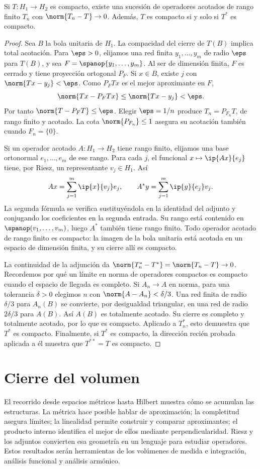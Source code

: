 \begin{teorema}\label{ch32:compactos}
Si $T:H_1\to H_2$ es compacto, existe una sucesión de operadores acotados de rango finito $T_n$ con $\norm{T_n-T}\to0$. Además, $T$ es compacto si y solo si $T^*$ es compacto.
\end{teorema}
\begin{proof}
Sea $B$ la bola unitaria de $H_1$. La compacidad del cierre de $T(B)$ implica total acotación. Para $\eps>0$, elijamos una red finita $y_1,\dots,y_m$ de radio $\eps$ para $T(B)$, y sea $F=\spanop\{y_1,\dots,y_m\}$. Al ser de dimensión finita, $F$ es cerrado y tiene proyección ortogonal $P_F$. Si $x\in B$, existe $j$ con $\norm{Tx-y_j}<\eps$. Como $P_FTx$ es el mejor aproximante en $F$,
\[
 \norm{Tx-P_FTx}\leq\norm{Tx-y_j}<\eps.
\]
Por tanto $\norm{T-P_FT}\leq\eps$. Elegir $\eps=1/n$ produce $T_n=P_{F_n}T$, de rango finito y acotado. La cota $\norm{P_{F_n}}\leq1$ asegura su acotación también cuando $F_n=\{0\}$.

Si un operador acotado $A:H_1\to H_2$ tiene rango finito, elijamos una base ortonormal $e_1,\dots,e_m$ de ese rango. Para cada $j$, el funcional $x\mapsto\ip{Ax}{e_j}$ tiene, por Riesz, un representante $v_j\in H_1$. Así
\[
 Ax=\sum_{j=1}^{m}\ip{x}{v_j}e_j,
 \qquad A^*y=\sum_{j=1}^{m}\ip{y}{e_j}v_j.
\]
La segunda fórmula se verifica sustituyéndola en la identidad del adjunto y conjugando los coeficientes en la segunda entrada. Su rango está contenido en $\spanop(v_1,\dots,v_m)$, luego $A^*$ también tiene rango finito. Todo operador acotado de rango finito es compacto: la imagen de la bola unitaria está acotada en un espacio de dimensión finita, y su cierre allí es compacto.

La continuidad de la adjunción da $\norm{T_n^*-T^*}=\norm{T_n-T}\to0$. Recordemos por qué un límite en norma de operadores compactos es compacto cuando el espacio de llegada es completo. Si $A_n\to A$ en norma, para una tolerancia $\delta>0$ elegimos $n$ con $\norm{A-A_n}<\delta/3$. Una red finita de radio $\delta/3$ para $A_n(B)$ se convierte, por desigualdad triangular, en una red de radio $2\delta/3$ para $A(B)$. Así $A(B)$ es totalmente acotado. Su cierre es completo y totalmente acotado, por lo que es compacto. Aplicado a $T_n^*$, esto demuestra que $T^*$ es compacto. Finalmente, si $T^*$ es compacto, la dirección recién probada aplicada a él muestra que $T^{**}=T$ es compacto.
\end{proof}

\section{Cierre del volumen}
El recorrido desde espacios métricos hasta Hilbert muestra cómo se acumulan las estructuras. La métrica hace posible hablar de aproximación; la completitud asegura límites; la linealidad permite construir y comparar aproximantes; el producto interno identifica el mejor de ellos mediante perpendicularidad. Riesz y los adjuntos convierten esa geometría en un lenguaje para estudiar operadores. Estos resultados serán herramientas de los volúmenes de medida e integración, análisis funcional y análisis armónico.
